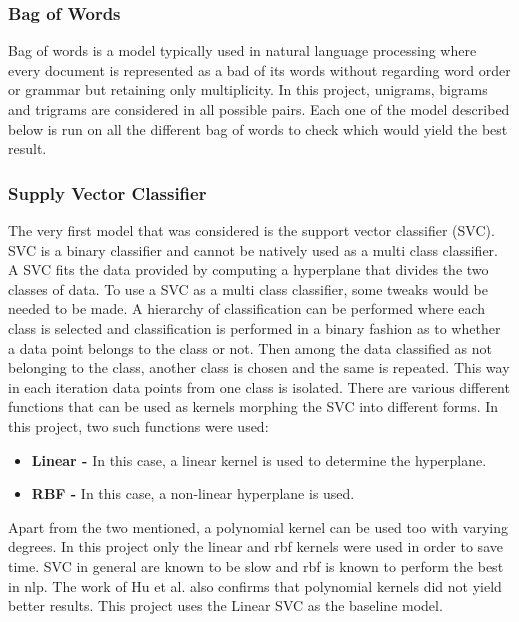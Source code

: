 \documentclass[11pt,a4paper]{article}
\begin{document}
\subsubsection{Bag of Words}
\label{bow}
Bag of words is a model typically used in natural language processing where every document is represented as a bad of its words without regarding word order or grammar but retaining only multiplicity. In this project, unigrams, bigrams and trigrams are considered in all possible pairs. Each one of the model described below is run on all the different bag of words to check which would yield the best result.

\subsubsection{Supply Vector Classifier}
\label{svc}
The very first model that was considered is the support vector classifier (SVC). SVC is a binary classifier and cannot be natively used as a multi class classifier. A SVC fits the data provided by computing a hyperplane that divides the two classes of data. To use a SVC as a multi class classifier, some tweaks would be needed to be made. A hierarchy of classification can be performed where each class is selected and classification is performed in a binary fashion as to whether a data point belongs to the class or not. Then among the data classified as not belonging to the class, another class is chosen and the same is repeated. This way in each iteration data points from one class is isolated. There are various different functions that can be used as kernels morphing the SVC into different forms. In this project, two such functions were used:
\begin{itemize}
  \item \textbf{Linear - } In this case, a linear kernel is used to determine the hyperplane.
  \item \textbf{RBF - } In this case, a non-linear hyperplane is used.
\end{itemize}
Apart from the two mentioned, a polynomial kernel can be used too with varying degrees. In this project only the linear and rbf kernels were used in order to save time. SVC in general are known to be slow and rbf is known to perform the best in nlp. The work of Hu et al. \cite{hu2009lyric} also confirms that polynomial kernels did not yield better results. This project uses the Linear SVC as the baseline model.
\end{document}
